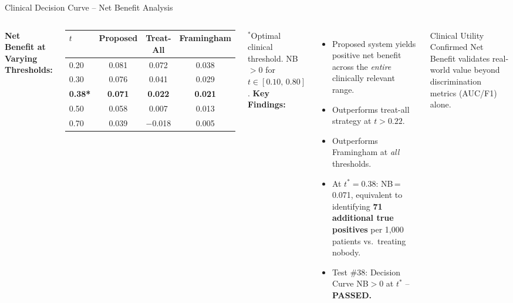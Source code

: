 \documentclass[aspectratio=169]{beamer}
\begin{document}
\begin{frame}{Clinical Decision Curve -- Net Benefit Analysis}
  \begin{columns}[T]
      \textbf{Net Benefit at Varying Thresholds:}
      \begin{center}\small
      \begin{tabular}{@{}lccc@{}}
        \toprule
        \textbf{$t$} & \textbf{Proposed} & \textbf{Treat-All} & \textbf{Framingham} \\
        \midrule
        0.20 & 0.081 & 0.072 & 0.038 \\
        0.30 & 0.076 & 0.041 & 0.029 \\
        \textbf{0.38*} & \textbf{0.071} & \textbf{0.022} & \textbf{0.021} \\
        0.50 & 0.058 & 0.007 & 0.013 \\
        0.70 & 0.039 & $-$0.018 & 0.005 \\
        \bottomrule
      \end{tabular}
      \end{center}
      {\small $^*$Optimal clinical threshold. NB$>0$ for $t\in[0.10,\,0.80]$.}
      \textbf{Key Findings:}
      \begin{itemize}\small
        \item Proposed system yields positive net benefit
              across the \emph{entire} clinically relevant range.
        \item Outperforms treat-all strategy at $t>0.22$.
        \item Outperforms Framingham at \emph{all} thresholds.
        \item At $t^*{=}0.38$: NB\,=\,0.071, equivalent to
              identifying \textbf{71 additional true positives}
              per 1,000 patients vs.\ treating nobody.
        \item Test \#38: Decision Curve NB$>$0 at $t^*$ --
              {\color{teal!80!black}\textbf{PASSED.}}
      \end{itemize}
      \begin{block}{Clinical Utility Confirmed}
        Net Benefit validates real-world value beyond
        discrimination metrics (AUC/F1) alone.
      \end{block}
  \end{columns}
\end{frame}
\end{document}
